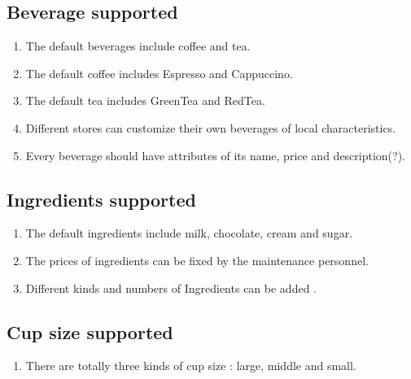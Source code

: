 \documentclass[a4paper]{report}
\begin{document}
\subsection{Beverage supported}
\begin{enumerate}
\item The default beverages include coffee and tea.
\item The default coffee includes Espresso and Cappuccino.
\item The default tea includes GreenTea and RedTea.
\item Different stores can customize their own beverages of local characteristics.
\item Every beverage should have attributes of its name, price and description(?).

\end{enumerate}

\subsection{Ingredients supported}
\begin{enumerate}
\item The default ingredients include milk, chocolate, cream and sugar.
\item The prices of ingredients can be fixed by the maintenance personnel.
\item Different kinds and numbers of Ingredients can be added .
\end{enumerate}

\subsection{Cup size supported}
\begin{enumerate}
\item There are totally three kinds of cup size : large, middle and small.
\end{enumerate}
\end{document}
